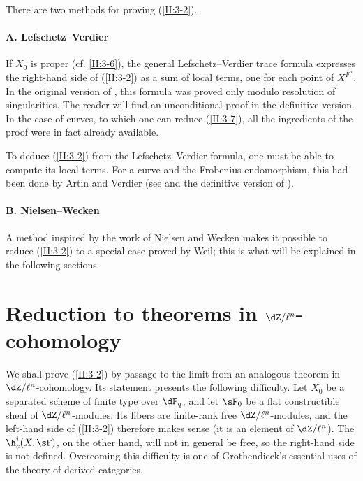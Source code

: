 There are two methods for proving (\ref{II:3-2}).



\paragraph{A. Lefschetz--Verdier}
If $X_0$ is proper (cf. \ref{II:3-6}), the general Lefschetz--Verdier trace
formula expresses the right-hand side of (\ref{II:3-2}) as a sum of local
terms, one for each point of $X^{F^n}$. In the original version of
\cite{sga5}, this formula was proved only modulo resolution of singularities.
The reader will find an unconditional proof in the definitive version. In
the case of curves, to which one can reduce (\ref{II:3-7}), all the
ingredients of the proof were in fact already available.

To deduce (\ref{II:3-2}) from the Lefschetz--Verdier formula, one must be
able to compute its local terms. For a curve and the Frobenius endomorphism,
this had been done by Artin and Verdier (see  and the definitive version of \cite{sga5}).



\paragraph{B. Nielsen--Wecken}
A method inspired by the work of Nielsen and Wecken makes it possible to
reduce (\ref{II:3-2}) to a special case proved by Weil; this is what will be
explained in the following sections.











\section{Reduction to theorems in \texorpdfstring{$\dZ/\ell^n$}{Z/l n}-cohomology}\label{II:4}

We shall prove (\ref{II:3-2}) by passage to the limit from an analogous
theorem in $\dZ/\ell^n$-cohomology. Its statement presents the following
difficulty. Let $X_0$ be a separated scheme of finite type over $\dF_q$, and
let $\sF_0$ be a flat constructible sheaf of $\dZ/\ell^n$-modules. Its fibers
are finite-rank free $\dZ/\ell^n$-modules, and the left-hand side of
(\ref{II:3-2}) therefore makes sense (it is an element of $\dZ/\ell^n$).
The $\h_c^i(X,\sF)$, on the other hand, will not in general be free, so the
right-hand side is not defined. Overcoming this difficulty is one of
Grothendieck's essential uses of the theory of derived categories.






